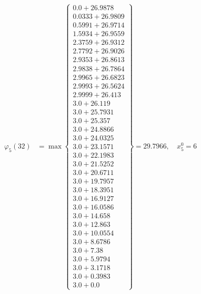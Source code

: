 \documentclass{article}
\begin{document}
\begin{align*}
\varphi_{5}(32) &= \max \left\{ \begin{array}{c}
0.0 + 26.9878 \\
 0.0333 + 26.9809 \\
 0.5991 + 26.9714 \\
 1.5934 + 26.9559 \\
 2.3759 + 26.9312 \\
 2.7792 + 26.9026 \\
 2.9353 + 26.8613 \\
 2.9838 + 26.7864 \\
 2.9965 + 26.6823 \\
 2.9993 + 26.5624 \\
 2.9999 + 26.413 \\
 3.0 + 26.119 \\
 3.0 + 25.7931 \\
 3.0 + 25.357 \\
 3.0 + 24.8866 \\
 3.0 + 24.0325 \\
 3.0 + 23.1571 \\
 3.0 + 22.1983 \\
 3.0 + 21.5252 \\
 3.0 + 20.6711 \\
 3.0 + 19.7957 \\
 3.0 + 18.3951 \\
 3.0 + 16.9127 \\
 3.0 + 16.0586 \\
 3.0 + 14.658 \\
 3.0 + 12.863 \\
 3.0 + 10.0554 \\
 3.0 + 8.6786 \\
 3.0 + 7.38 \\
 3.0 + 5.9794 \\
 3.0 + 3.1718 \\
 3.0 + 0.3983 \\
 3.0 + 0.0
\end{array} \right\}=29.7966, \quad x_{5}^0=6\\
  

\end{align*}
\end{document}
